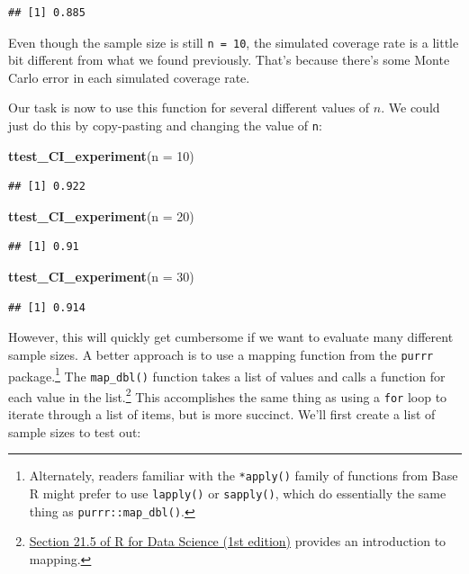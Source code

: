 \documentclass[
]{book}
\newenvironment{Shaded}{\begin{snugshade}}{\end{snugshade}}
\newcommand{\AttributeTok}[1]{\textcolor[rgb]{0.13,0.29,0.53}{#1}}
\newcommand{\DecValTok}[1]{\textcolor[rgb]{0.00,0.00,0.81}{#1}}
\newcommand{\FunctionTok}[1]{\textcolor[rgb]{0.13,0.29,0.53}{\textbf{#1}}}
\newcommand{\NormalTok}[1]{#1}
\begin{document}
\begin{verbatim}
## [1] 0.885
\end{verbatim}

Even though the sample size is still \texttt{n\ =\ 10}, the simulated coverage rate is a little bit different from what we found previously.
That's because there's some Monte Carlo error in each simulated coverage rate.

Our task is now to use this function for several different values of \(n\). We could just do this by copy-pasting and changing the value of \texttt{n}:

\begin{Shaded}
\begin{Highlighting}[]
\FunctionTok{ttest\_CI\_experiment}\NormalTok{(}\AttributeTok{n =} \DecValTok{10}\NormalTok{)}
\end{Highlighting}
\end{Shaded}

\begin{verbatim}
## [1] 0.922
\end{verbatim}

\begin{Shaded}
\begin{Highlighting}[]
\FunctionTok{ttest\_CI\_experiment}\NormalTok{(}\AttributeTok{n =} \DecValTok{20}\NormalTok{)}
\end{Highlighting}
\end{Shaded}

\begin{verbatim}
## [1] 0.91
\end{verbatim}

\begin{Shaded}
\begin{Highlighting}[]
\FunctionTok{ttest\_CI\_experiment}\NormalTok{(}\AttributeTok{n =} \DecValTok{30}\NormalTok{)}
\end{Highlighting}
\end{Shaded}

\begin{verbatim}
## [1] 0.914
\end{verbatim}

However, this will quickly get cumbersome if we want to evaluate many different sample sizes.
A better approach is to use a mapping function from the \texttt{purrr} package.\footnote{Alternately, readers familiar with the \texttt{*apply()} family of functions from Base R might prefer to use \texttt{lapply()} or \texttt{sapply()}, which do essentially the same thing as \texttt{purrr::map\_dbl()}.}
The \texttt{map\_dbl()} function takes a list of values and calls a function for each value in the list.\footnote{\href{https://r4ds.had.co.nz/iteration.html\#the-map-functions}{Section 21.5 of R for Data Science (1st edition)} provides an introduction to mapping.}
This accomplishes the same thing as using a \texttt{for} loop to iterate through a list of items, but is more succinct.
We'll first create a list of sample sizes to test out:
\end{document}
